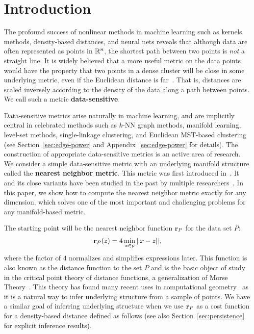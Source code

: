 \section{Introduction}

The profound success of nonlinear methods in machine learning such as kernels methods, density-based distances, and neural nets reveals that although data are often represented as points in $\mathbb{R}^n$, the shortest path between two points is \emph{not} a straight line.
It is widely believed that a more useful metric on the data points would
have the property that two points in a dense cluster will be close in some
underlying metric, even if the Euclidean distance is far~\cite{vL09,
cohen15approximating, vincent03, bijral11semiSupLearningDBD}.
That is, distances are scaled inversely according to the density of the data along a path between points.
We call such a metric \textbf{data-sensitive}.

Data-sensitive metrics arise naturally in machine learning, and are
implicitly central in celebrated methods such as $k$-NN graph methods,
manifold learning, level-set methods, single-linkage clustering, and
Euclidean MST-based clustering (see Section~\ref{sec:edge-power} and
Appendix~\ref{sec:edge-power} for details).
The construction of appropriate data-sensitive metrics is an active area of research.
We consider a simple data-sensitive metric with an underlying manifold structure called the \textbf{nearest neighbor metric}.
This metric was first introduced in~\cite{cohen15approximating}. It and its close variants have been studied in the past by
multiple
researchers~\cite{bijral11semiSupLearningDBD,vincent03,sajama05estimatingDBDM,
cohen15approximating}.
In this paper, we show how to compute the nearest neighbor metric exactly
for any dimension, which solves one of the most important and challenging
problems for any manifold-based metric.

The starting point will be the nearest neighbor function $\mathbf{r}_P$ for
the data set $P$:
\[
\mathbf{r}_P(z) = 4\min_{x\in p} \|x-z\|,
\]
where the factor of $4$ normalizes and simplifies expressions later.
This function is also known as the distance function to the set $P$ and is the basic object of study in the critical point theory of distance functions, a generalization of Morse Theory~\cite{grove93critical}.
This theory has found many recent uses in computational geometry~\cite{chazal08smooth,chazal09sampling} as it is a natural way to infer underlying structure from a sample of points.
We have a similar goal of inferring underlying structure when we use $\mathbf{r}_P$ as a cost function for a density-based distance defined as follows (see also Section~\ref{sec:persistence} for explicit inference results).

